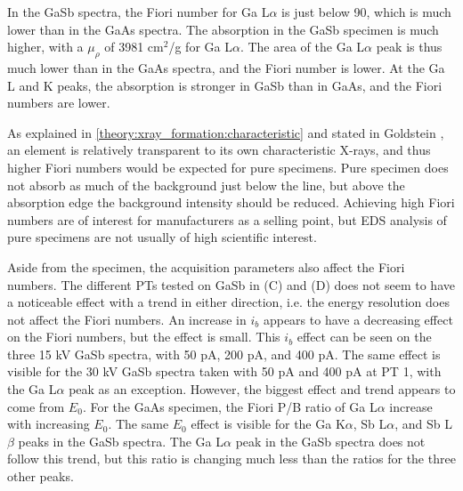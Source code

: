 In the GaSb spectra, the Fiori number for Ga L$\alpha$ is just below 90, which is much lower than in the GaAs spectra.
The absorption in the GaSb specimen is much higher, with a $\mu_\rho$ of 3981 cm$^2$/g for Ga L$\alpha$.
The area of the Ga L$\alpha$ peak is thus much lower than in the GaAs spectra, and the Fiori number is lower.
At the Ga L and K peaks, the absorption is stronger in GaSb than in GaAs, and the Fiori numbers are lower.


As explained in \cref{theory:xray_formation:characteristic} and stated in Goldstein \cite[Ch. 4.4]{goldstein_scanning_2018}, an element is relatively transparent to its own characteristic X-rays, and thus higher Fiori numbers would be expected for pure specimens.
Pure specimen does not absorb as much of the background just below the line, but above the absorption edge the background intensity should be reduced.
Achieving high Fiori numbers are of interest for manufacturers as a selling point, but EDS analysis of pure specimens are not usually of high scientific interest.




Aside from the specimen, the acquisition parameters also affect the Fiori numbers.
The different PTs tested on GaSb in (C) and (D) does not seem to have a noticeable effect with a trend in either direction, i.e. the energy resolution does not affect the Fiori numbers.
An increase in $i_b$ appears to have a decreasing effect on the Fiori numbers, but the effect is small.
This $i_b$ effect can be seen on the three 15 kV GaSb spectra, with 50 pA, 200 pA, and 400 pA.
The same effect is visible for the 30 kV GaSb spectra taken with 50 pA and 400 pA at PT 1, with the Ga L$\alpha$ peak as an exception.
However, the biggest effect and trend appears to come from $E_0$.
For the GaAs specimen, the Fiori P/B ratio of Ga L$\alpha$ increase with increasing $E_0$.
The same $E_0$ effect is visible for the Ga K$\alpha$, Sb L$\alpha$, and Sb L$\beta$ peaks in the GaSb spectra.
The Ga L$\alpha$ peak in the GaSb spectra does not follow this trend, but this ratio is changing much less than the ratios for the three other peaks.


